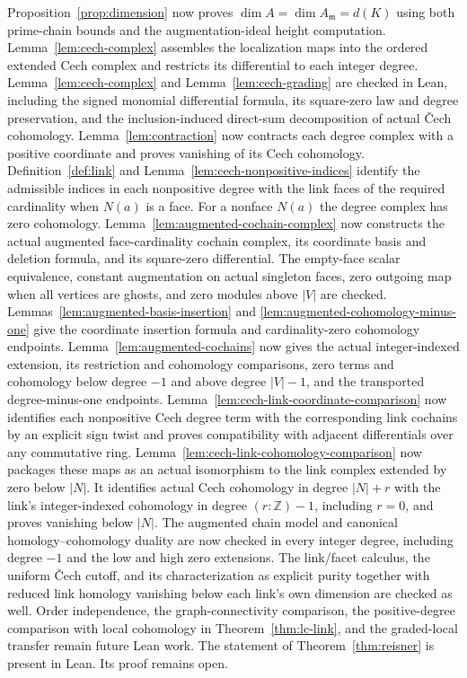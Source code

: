 Proposition~\ref{prop:dimension} now proves
$\dim A=\dim A_{\mathfrak m}=d(K)$ using both prime-chain bounds and
the augmentation-ideal height computation. Lemma~\ref{lem:cech-complex}
assembles the localization maps into the ordered extended Cech complex
and restricts its differential to each integer degree.
Lemma~\ref{lem:cech-complex} and Lemma~\ref{lem:cech-grading} are checked in
Lean, including the signed monomial differential formula, its square-zero
law and degree preservation, and the inclusion-induced direct-sum
decomposition of actual Čech cohomology. Lemma~\ref{lem:contraction} now
contracts each degree complex with a positive coordinate and proves
vanishing of its Cech cohomology. Definition~\ref{def:link} and
Lemma~\ref{lem:cech-nonpositive-indices} identify the admissible indices
in each nonpositive degree with the link faces of the required cardinality
when $N(a)$ is a face. For a nonface $N(a)$ the degree complex has zero
cohomology. Lemma~\ref{lem:augmented-cochain-complex} now constructs the
actual augmented face-cardinality cochain complex, its coordinate basis
and deletion formula, and its square-zero differential. The empty-face
scalar equivalence, constant augmentation on actual singleton faces,
zero outgoing map when all vertices are ghosts, and zero modules above
$|V|$ are checked. Lemmas~\ref{lem:augmented-basis-insertion} and
\ref{lem:augmented-cohomology-minus-one} give the coordinate insertion
formula and cardinality-zero cohomology endpoints.
Lemma~\ref{lem:augmented-cochains} now gives the actual integer-indexed
extension, its restriction and cohomology comparisons, zero terms and
cohomology below degree $-1$ and above degree $|V|-1$, and the transported
degree-minus-one endpoints. Lemma~\ref{lem:cech-link-coordinate-comparison}
now identifies each nonpositive Cech degree term with the corresponding
link cochains by an explicit sign twist and proves compatibility with
adjacent differentials over any commutative ring.
Lemma~\ref{lem:cech-link-cohomology-comparison} now packages these maps as
an actual isomorphism to the link complex extended by zero below $|N|$.
It identifies actual Cech cohomology in degree $|N|+r$ with the link's
integer-indexed cohomology in degree $(r:\mathbb Z)-1$, including $r=0$,
and proves vanishing below $|N|$. The augmented chain model and canonical
homology--cohomology duality are now checked in every integer degree,
including degree $-1$ and the low and high zero extensions. The link/facet
calculus, the uniform Čech cutoff, and its characterization as explicit
purity together with reduced link homology vanishing below each link's own
dimension are checked as well. Order independence, the graph-connectivity
comparison, the positive-degree comparison with local cohomology in
Theorem~\ref{thm:lc-link}, and the graded-local transfer remain future Lean
work. The statement of Theorem~\ref{thm:reisner} is present in Lean. Its
proof remains open.

